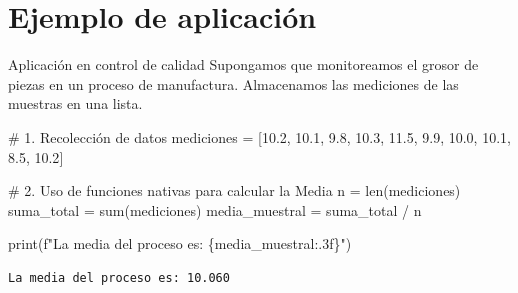 \documentclass[
  ignorenonframetext,
  aspectratio=169,
  spanish,
]{beamer}
\newenvironment{Shaded}{\begin{snugshade}}{\end{snugshade}}
\newcommand{\BuiltInTok}[1]{\textcolor[rgb]{0.00,0.23,0.31}{#1}}
\newcommand{\CommentTok}[1]{\textcolor[rgb]{0.37,0.37,0.37}{#1}}
\newcommand{\FloatTok}[1]{\textcolor[rgb]{0.68,0.00,0.00}{#1}}
\newcommand{\NormalTok}[1]{\textcolor[rgb]{0.00,0.23,0.31}{#1}}
\newcommand{\OperatorTok}[1]{\textcolor[rgb]{0.37,0.37,0.37}{#1}}
\newcommand{\SpecialCharTok}[1]{\textcolor[rgb]{0.37,0.37,0.37}{#1}}
\newcommand{\SpecialStringTok}[1]{\textcolor[rgb]{0.13,0.47,0.30}{#1}}
\begin{document}
\section{Ejemplo de aplicación}\label{ejemplo-de-aplicaciuxf3n}

\begin{frame}[fragile]{Aplicación en control de calidad}
\label{aplicaciuxf3n-en-control-de-calidad}
Supongamos que monitoreamos el grosor de piezas en un proceso de
manufactura. Almacenamos las mediciones de las muestras en una lista.

\begin{Shaded}
\begin{Highlighting}[]
\CommentTok{\# 1. Recolección de datos}
\NormalTok{mediciones }\OperatorTok{=}\NormalTok{ [}\FloatTok{10.2}\NormalTok{, }\FloatTok{10.1}\NormalTok{, }\FloatTok{9.8}\NormalTok{, }\FloatTok{10.3}\NormalTok{, }\FloatTok{11.5}\NormalTok{, }\FloatTok{9.9}\NormalTok{, }\FloatTok{10.0}\NormalTok{, }\FloatTok{10.1}\NormalTok{, }\FloatTok{8.5}\NormalTok{, }\FloatTok{10.2}\NormalTok{]}

\CommentTok{\# 2. Uso de funciones nativas para calcular la Media}
\NormalTok{n }\OperatorTok{=} \BuiltInTok{len}\NormalTok{(mediciones)}
\NormalTok{suma\_total }\OperatorTok{=} \BuiltInTok{sum}\NormalTok{(mediciones)}
\NormalTok{media\_muestral }\OperatorTok{=}\NormalTok{ suma\_total }\OperatorTok{/}\NormalTok{ n}

\BuiltInTok{print}\NormalTok{(}\SpecialStringTok{f"La media del proceso es: }\SpecialCharTok{\{}\NormalTok{media\_muestral}\SpecialCharTok{:.3f\}}\SpecialStringTok{"}\NormalTok{)}
\end{Highlighting}
\end{Shaded}

\begin{verbatim}
La media del proceso es: 10.060
\end{verbatim}
\end{frame}
\end{document}
